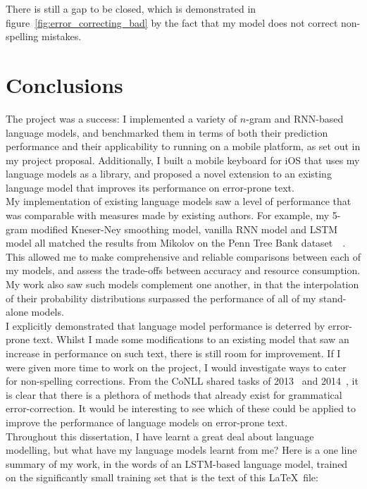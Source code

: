 \documentclass[a4paper, 12pt]{report}
\begin{document}
There is still a gap to be closed, which is demonstrated in figure~\ref{fig:error_correcting_bad} by the fact that my model does not correct non-spelling mistakes.

\chapter{Conclusions}

The project was a success: I implemented a variety of $n$-gram and RNN-based language models, and benchmarked them in terms of both their prediction performance and their applicability to running on a mobile platform, as set out in my project proposal. Additionally, I built a mobile keyboard for iOS that uses my language models as a library, and proposed a novel extension to an existing language model that improves its performance on error-prone text. \\

My implementation of existing language models saw a level of performance that was comparable with measures made by existing authors. For example, my 5-gram modified Kneser-Ney smoothing model, vanilla RNN model and LSTM model all matched the results from Mikolov on the Penn Tree Bank dataset~\cite{rnn_ptb:mikolov2012}~\cite{lstm_ptb:mikolov2014}. This allowed me to make comprehensive and reliable comparisons between each of my models, and assess the trade-offs between accuracy and resource consumption. My work also saw such models complement one another, in that the interpolation of their probability distributions surpassed the performance of all of my stand-alone models. \\

I explicitly demonstrated that language model performance is deterred by error-prone text. Whilst I made some modifications to an existing model that saw an increase in performance on such text, there is still room for improvement. If I were given more time to work on the project, I would investigate ways to cater for non-spelling corrections. From the CoNLL shared tasks of 2013~\cite{error_correction2013:ng2013} and 2014~\cite{error_correction2014:ng2014}, it is clear that there is a plethora of methods that already exist for grammatical error-correction. It would be interesting to see which of these could be applied to improve the performance of language models on error-prone text. \\

Throughout this dissertation, I have learnt a great deal about language modelling, but what have my language models learnt from me? Here is a one line summary of my work, in the words of an LSTM-based language model, trained on the significantly small training set that is the text of this \LaTeX\ file:
\end{document}
